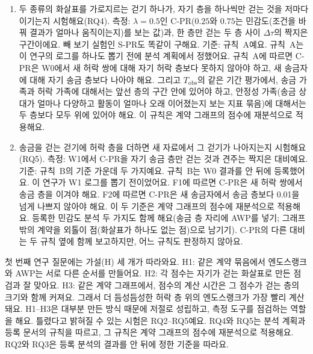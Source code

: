 \begin{enumerate}
\item[O4.] 두 종류의 화살표를 가로지르는 걷기 하나가, 자기 층을 하나씩만 걷는 것을 저마다 이기는지 시험해요(RQ4). 측정: $\lambda=0.5$인 \mbox{C-PR}($0.25$와 $0.75$는 민감도(조건을 바꿔 결과가 얼마나 움직이는지)를 보는 값)과, 한 층만 걷는 두 층 사이 $\Delta\tau$의 짝지은 구간이에요. 빼 보기 실험인 \mbox{S-PR}도 똑같이 구해요. 기준: 규칙~A예요. 규칙~A는 이 연구의 로그를 하나도 뽑기 전에 분석 계획에서 정했어요. 규칙~A에 따르면 \mbox{C-PR}은 W0에서 새 허락 쌍에 대해 자기 허락 층보다 못하지 않아야 하고, 새 송금자에 대해 자기 송금 층보다 나아야 해요. 그리고 $T_{\mathrm{obs}}$의 같은 기간 평가에서, 송금 가족과 허락 가족에 대해서는 앞선 층의 구간 안에 있어야 하고, 안정성 가족(송금 상대가 얼마나 다양하고 활동이 얼마나 오래 이어졌는지 보는 지표 묶음)에 대해서는 두 층보다 모두 위에 있어야 해요. 이 규칙은 계약 그래프의 점수에 재분석으로 적용해요.
\item[O5.] 송금을 걷는 걷기에 허락 층을 더하면 새 자료에서 그 걷기가 나아지는지 시험해요(RQ5). 측정: W1에서 \mbox{C-PR}을 자기 송금 층만 걷는 것과 견주는 짝지은 대비예요. 기준: 규칙~B의 기준 가운데 두 가지예요. 규칙~B는 W0 결과를 안 뒤에 등록했어요. 이 연구가 W1 로그를 뽑기 전이었어요. F1에 따르면 \mbox{C-PR}은 새 허락 쌍에서 송금 층을 이겨야 해요. F2에 따르면 \mbox{C-PR}은 새 송금자에서 송금 층보다 0.01을 넘게 나쁘지 않아야 해요. 이 두 기준은 계약 그래프의 점수에 재분석으로 적용해요. 등록한 민감도 분석 두 가지도 함께 해요(송금 층 자리에 AWP를 넣기; 그래프 밖의 계약을 외톨이 점(화살표가 하나도 없는 점)으로 남기기). \mbox{C-PR}의 다른 대비는 두 규칙 옆에 함께 보고하지만, 어느 규칙도 판정하지 않아요.
\end{enumerate}


첫 번째 연구 질문에는 가설(H) 세 개가 따라와요. H1: 같은 계약 묶음에서 엔도스랭크와 AWP는 서로 다른 순서를 만들어요. H2: 각 점수는 자기가 걷는 화살표로 만든 점검과 잘 맞아요. H3: 같은 계약 그래프에서, 점수의 계산 시간은 그 점수가 걷는 층의 크기와 함께 커져요. 그래서 더 듬성듬성한 허락 층 위의 엔도스랭크가 가장 빨리 계산돼요. H1--H3은 대부분 만든 방식 때문에 저절로 성립하고, 측정 도구를 점검하는 역할을 해요. 틀렸다고 밝혀질 수 있는 시험은 RQ2--RQ5예요. RQ4와 RQ5는 분석 계획과 등록 문서의 규칙을 따르고, 그 규칙은 계약 그래프의 점수에 재분석으로 적용해요. RQ2와 RQ3은 등록 분석의 결과를 안 뒤에 정한 기준을 따라요.

